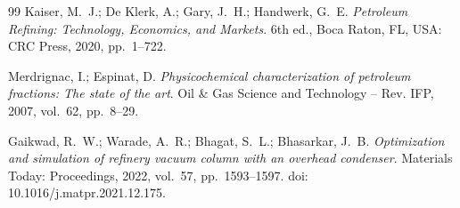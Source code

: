 \begin{thebibliography}{99}
Kaiser, M.~J.; De Klerk, A.; Gary, J.~H.; Handwerk, G.~E.
\newblock \emph{Petroleum Refining: Technology, Economics, and Markets}.
\newblock 6th ed., Boca Raton, FL, USA: CRC Press, 2020, pp.~1--722.

Merdrignac, I.; Espinat, D.
\newblock \emph{Physicochemical characterization of petroleum fractions: The state of the art}.
\newblock Oil \& Gas Science and Technology -- Rev. IFP, 2007, vol.~62, pp.~8--29.

Gaikwad, R.~W.; Warade, A.~R.; Bhagat, S.~L.; Bhasarkar, J.~B.
\newblock \emph{Optimization and simulation of refinery vacuum column with an overhead condenser}.
\newblock Materials Today: Proceedings, 2022, vol.~57, pp.~1593--1597.
\newblock doi: 10.1016/j.matpr.2021.12.175.

\end{thebibliography}